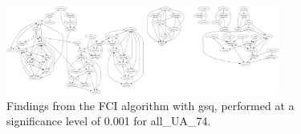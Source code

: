 \begin{figure}[htbp]
    \centering
    \includegraphics[width=0.8\textwidth]{Report/final_report/pictures/FCI_gsq_0.001_all_UA_74.png}
    \caption{Findings from the FCI algorithm with gsq, performed at a significance level of 0.001 for all_UA_74.}
    \label{fig:fci_gsq_0.001all_UA_74}
\end{figure}
